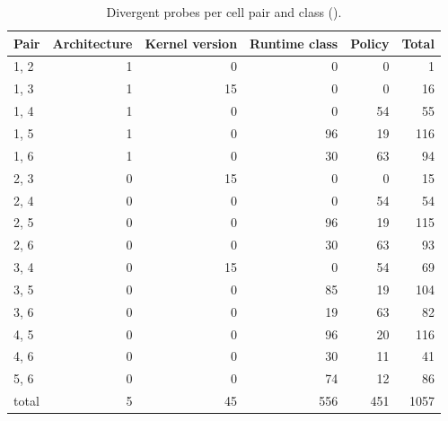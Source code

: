 \begin{table}[htbp]
\centering\small
\begin{tabular}{@{}lrrrrr@{}}
\toprule
\textbf{Pair} & \textbf{Architecture} & \textbf{Kernel version} & \textbf{Runtime class} & \textbf{Policy} & \textbf{Total} \\
\midrule
1, 2 & 1 & 0 & 0 & 0 & 1 \\
1, 3 & 1 & 15 & 0 & 0 & 16 \\
1, 4 & 1 & 0 & 0 & 54 & 55 \\
1, 5 & 1 & 0 & 96 & 19 & 116 \\
1, 6 & 1 & 0 & 30 & 63 & 94 \\
2, 3 & 0 & 15 & 0 & 0 & 15 \\
2, 4 & 0 & 0 & 0 & 54 & 54 \\
2, 5 & 0 & 0 & 96 & 19 & 115 \\
2, 6 & 0 & 0 & 30 & 63 & 93 \\
3, 4 & 0 & 15 & 0 & 54 & 69 \\
3, 5 & 0 & 0 & 85 & 19 & 104 \\
3, 6 & 0 & 0 & 19 & 63 & 82 \\
4, 5 & 0 & 0 & 96 & 20 & 116 \\
4, 6 & 0 & 0 & 30 & 11 & 41 \\
5, 6 & 0 & 0 & 74 & 12 & 86 \\
\midrule
total & 5 & 45 & 556 & 451 & 1057 \\
\bottomrule
\end{tabular}
\caption{Divergent probes per cell pair and class ().}
\label{tab:divergence}
\end{table}

